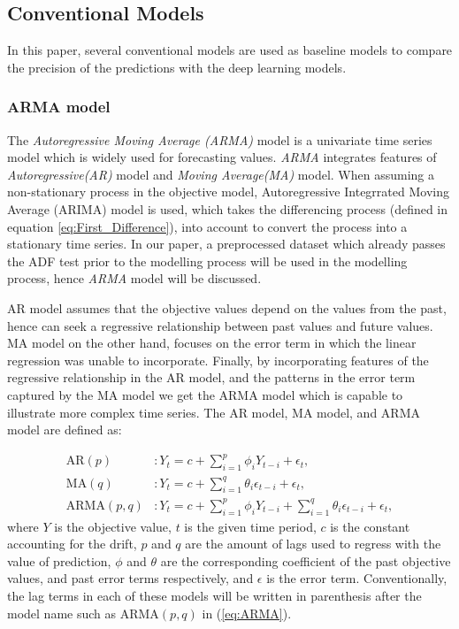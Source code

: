 \subsection{Conventional Models}
In this paper, several conventional models are used as baseline models to compare the precision of the predictions with the deep learning models. 
\subsubsection{ARMA model}
The \textit{Autoregressive Moving Average (ARMA)} model is a univariate time series model which is widely used for forecasting values. \textit{ARMA} integrates features of \textit{Autoregressive(AR)} model and \textit{Moving Average(MA)} model. When assuming a non-stationary process in the objective model, Autoregressive Integrrated Moving Average (ARIMA) model is used, which takes the differencing process (defined in equation \ref{eq:First_Difference}), into account to convert the process into a stationary time series. In our paper, a preprocessed dataset which already passes the ADF test prior to the modelling process will be used in the modelling process, hence \textit{ARMA} model will be discussed.

AR model assumes that the objective values depend on the values from the past, hence can seek a regressive relationship between past values and future values. MA model on the other hand, focuses on the error term in which the linear regression was unable to incorporate. Finally, by incorporating features of the regressive relationship in the AR model, and the patterns in the error term captured by the MA model we get the ARMA model which is capable to illustrate more complex time series. The AR model, MA model, and ARMA model are defined as:

\begin{align}\label{eq:ARMA}    
    \mathrm{A R}(p)&: Y_{t}=c+\sum_{i=1}^{p} \phi_{i} Y_{t-i}+\epsilon_{t},\\
    \mathrm{M A}(q)&: Y_{t}=c+\sum_{i=1}^{q} \theta_{i} \epsilon_{t-i}+\epsilon_{t},\\
    \mathrm{A R M A}(p, q)&: Y_{t}=c+\sum_{i=1}^{p} \phi_{i} Y_{t-i}+\sum_{i=1}^{q} \theta_{i} \epsilon_{t-i}+\epsilon_{t},
\end{align}
where $Y$ is the objective value, $t$ is the given time period, $c$ is the constant accounting for the drift, $p$ and $q$ are the amount of lags used to regress with the value of prediction, $\phi$ and $\theta$ are the corresponding coefficient of the past objective values, and past error terms respectively, and $\epsilon$ is the error term. Conventionally, the lag terms in each of these models will be written in parenthesis after the model name such as $\mathrm{A R M A}(p, q)$ in  (\ref{eq:ARMA}). 

